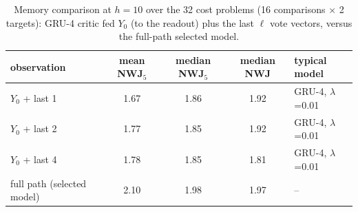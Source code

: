 \begin{table}[htbp]
\centering
\small
\caption{Memory comparison at $h=10$ over the 32 cost problems (16 comparisons $\times$ 2 targets): GRU-4 critic fed $Y_0$ (to the readout) plus the last $\ell$ vote vectors, versus the full-path selected model.}\label{tab:memory}
\begin{tabular}{l ccc l}
\toprule
observation & mean NWJ$_5$ & median NWJ$_5$ & median NWJ & typical model \\
\midrule
$Y_0$ + last 1 & 1.67 & 1.86 & 1.92 & GRU-4, $\lambda$=0.01 \\
$Y_0$ + last 2 & 1.77 & 1.85 & 1.92 & GRU-4, $\lambda$=0.01 \\
$Y_0$ + last 4 & 1.78 & 1.85 & 1.81 & GRU-4, $\lambda$=0.01 \\
full path (selected model) & 2.10 & 1.98 & 1.97 & -- \\
\bottomrule
\end{tabular}
\end{table}